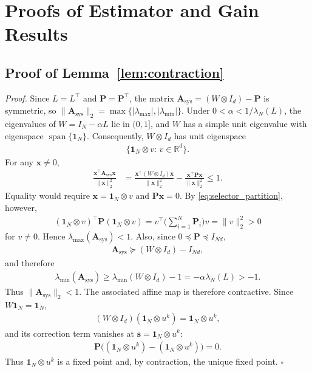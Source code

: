 \documentclass[letterpaper, 10 pt, conference]{ieeeconf} %
\newenvironment{proof}[1][Proof]{\par\noindent\textit{#1. }\ignorespaces}
  {\hfill$\square$\par}
\begin{document}
\newpage

\section{Proofs of Estimator and Gain Results}
\label{app:estimator_gain_proofs}

\subsection{Proof of Lemma~\ref{lem:contraction}}
\begin{proof}
Since \(L=L^\top\) and \(\mathbf P=\mathbf P^\top\), the matrix \(\mathbf A_{\mathrm{sys}}=(W\otimes I_d)-\mathbf P\) is symmetric, so \(\|\mathbf A_{\mathrm{sys}}\|_2=\max\{|\lambda_{\max}|,|\lambda_{\min}|\}\). Under \(0<\alpha<1/\lambda_N(L)\), the eigenvalues of \(W=I_N-\alpha L\) lie in \((0,1]\), and \(W\) has a simple unit eigenvalue with eigenspace \(\operatorname{span}\{\mathbf 1_N\}\). Consequently, \(W\otimes I_d\) has unit eigenspace
\begin{align}
\{\mathbf 1_N\otimes v:\,v\in\mathbb R^d\}.
\end{align}
For any \(\mathbf x\neq 0\),
\begin{align}
\frac{\mathbf x^\top\mathbf A_{\mathrm{sys}}\mathbf x}{\|\mathbf x\|_2^2}
&=
\frac{\mathbf x^\top(W\otimes I_d)\mathbf x}{\|\mathbf x\|_2^2}
-
\frac{\mathbf x^\top\mathbf P\mathbf x}{\|\mathbf x\|_2^2}
\le 1.
\end{align}
Equality would require \(\mathbf x=\mathbf 1_N\otimes v\) and \(\mathbf P\mathbf x=0\). By \eqref{eq:selector_partition}, however,
\begin{align}
(\mathbf 1_N\otimes v)^\top \mathbf P (\mathbf 1_N\otimes v)
=
v^\top\Big(\sum_{i=1}^N\mathbf P_i\Big)v
=
\|v\|_2^2>0
\end{align}
for \(v\neq 0\). Hence \(\lambda_{\max}(\mathbf A_{\mathrm{sys}})<1\). Also, since \(0\preceq \mathbf P\preceq I_{Nd}\),
\begin{align}
\mathbf A_{\mathrm{sys}}
\succeq
(W\otimes I_d)-I_{Nd},
\end{align}
and therefore
\begin{align}
\lambda_{\min}(\mathbf A_{\mathrm{sys}})
\ge
\lambda_{\min}(W\otimes I_d)-1
=
-\alpha\lambda_N(L)>-1.
\end{align}
Thus \(\|\mathbf A_{\mathrm{sys}}\|_2<1\). The associated affine map is therefore contractive. Since \(W\mathbf1_N=\mathbf1_N\),
\begin{align}
(W\otimes I_d)(\mathbf1_N\otimes u^k)
=
\mathbf1_N\otimes u^k,
\end{align}
and its correction term vanishes at \(\mathbf s=\mathbf1_N\otimes u^k\):
\begin{align}
\mathbf P\bigl((\mathbf1_N\otimes u^k)
-(\mathbf1_N\otimes u^k)\bigr)=0.
\end{align}
Thus \(\mathbf1_N\otimes u^k\) is a fixed point and, by contraction, the unique fixed point.
\end{proof}
\end{document}
